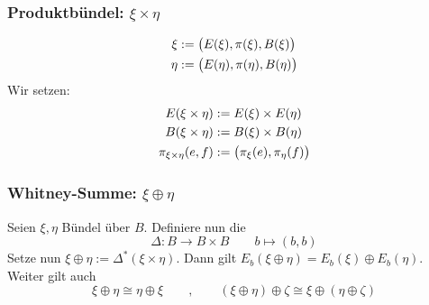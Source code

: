 \subsubsection{Produktbündel: $\xi \times \eta$} %
\label{ssub:434}
\begin{align*}
	\xi & := \enbrace[\big]{E(\xi), \pi(\xi), B(\xi)} \\
	\eta & := \enbrace[\big]{E(\eta), \pi (\eta), B(\eta)}
\end{align*}
Wir setzen:
\begin{align*}
	E(\xi \times \eta) & := E(\xi) \times E(\eta) \\
	B(\xi \times \eta) & := B(\xi) \times B(\eta) \\
	\pi_{\xi \times \eta} (e,f) & := \enbrace[\big]{\pi_\xi(e), \pi_\eta(f)} 
\end{align*}

\subsubsection{Whitney-Summe:  $\xi \oplus \eta$} %
\label{ssub:435}
Seien $\xi, \eta$ Bündel über $B$. Definiere nun die 
\[
	\Delta : B \to B \times B \qquad b \mapsto (b,b)
\]
Setze nun $\xi \oplus \eta := \Delta^*(\xi \times \eta)$. Dann gilt $E_b(\xi \oplus \eta) = E_b(\xi) \oplus E_b(\eta)$. Weiter gilt auch
\[
	\xi \oplus \eta \cong \eta \oplus \xi \qquad , \qquad (\xi \oplus \eta) \oplus \zeta \cong \xi \oplus (\eta \oplus \zeta)
\]

